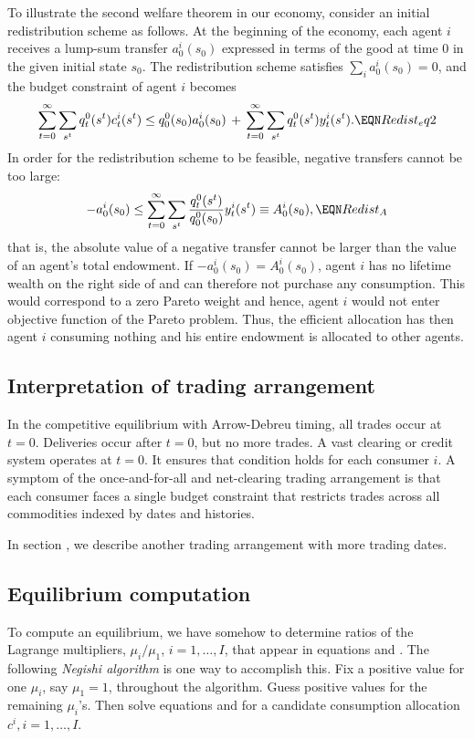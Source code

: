 To illustrate the second welfare theorem in our economy, 
consider an initial redistribution scheme as follows.
At the beginning of the economy, each agent $i$
receives a lump-sum transfer $a_0^i(s_0)$ expressed in 
terms of the good at time 0 in the given initial state
$s_0$. The redistribution scheme satisfies
$\sum_i a_0^i(s_0) = 0$, and the budget constraint of 
agent $i$ becomes 
$$ \sum_{t=0}^\infty \sum_{s^t}  q_t^0(s^t)  c_t^i(s^t)   \leq  q_0^0(s_0) a_0^i(s_0) \,+\,
   \sum_{t=0}^\infty \sum_{s^t}  q_t^0(s^t) y_t^i(s^t).   \EQN Redist_eq2 $$
In order for the redistribution scheme to be feasible,
negative transfers cannot be too large:
$$ - a_0^i(s_0) \leq 
 \sum_{t=0}^\infty \sum_{s^t}  {q_t^0(s^t) \over 
                                q_0^0(s_0)} y_t^i(s^t)
  \equiv A_0^i(s_0),                    \EQN Redist_A
$$   
that is, the absolute value of a negative transfer 
cannot be larger than the value of an agent's total
endowment. If $ - a_0^i(s_0) = A_0^i(s_0)$, 
agent $i$ has no lifetime wealth on the 
right side of  and can therefore not
purchase any consumption. This would correspond to a zero 
Pareto weight and hence, agent $i$ would not
enter objective function  of the 
Pareto problem. Thus, the efficient allocation has 
then agent $i$ consuming nothing and his entire 
endowment is allocated to other agents.


\subsection{Interpretation of trading arrangement}
  In the  competitive   equilibrium with Arrow-Debreu timing, all trades occur at $t=0$.  Deliveries occur after $t=0$, but no more trades.
  A vast clearing or credit system operates at $t=0$.
It ensures that condition  holds for each consumer
$i$.   A symptom of the once-and-for-all and net-clearing trading arrangement is
that each consumer faces a single  budget constraint that restricts  trades across all commodities indexed by  dates and histories.


  In section , we describe another trading arrangement with
more trading dates. %


\subsection{Equilibrium computation}\label{sec:Negishi}%
To compute an equilibrium, we have somehow to determine ratios of
the Lagrange multipliers, $\mu_i / \mu_1$, $i=1, \ldots, I $,
that appear in equations  and .  The following {\it
Negishi algorithm\/} is one way to accomplish this.
\medskip
{}  Fix a positive value for one $\mu_i$, say $\mu_1=1$,
throughout the algorithm.  Guess  positive values for the
remaining  $\mu_i$'s. Then solve  equations  and  for
a candidate consumption allocation $c^i, i=1, \ldots, I$.

